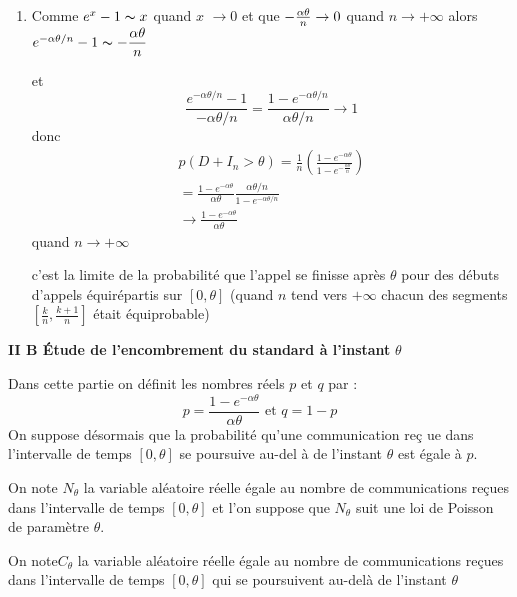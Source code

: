 \documentclass[a4paper, 11pt,reqno]{article}
\begin{document}
\begin{enumerate}
\item Comme $e^{x}-1\thicksim x$ quand $x$ $\rightarrow 0$ et que $-\frac{%
\alpha \theta }{n}\rightarrow 0$ quand $n\rightarrow +\infty $ alors $%
e^{-\alpha \theta /n}-1\thicksim -\displaystyle\frac{\alpha \theta }{n}$

et 
\begin{equation*}
\frac{e^{-\displaystyle \alpha \theta /n}-1}{-\alpha \theta /n}=\frac{1-e^{-%
\displaystyle \alpha \theta /n}}{\alpha \theta /n}\rightarrow 1
\end{equation*}
donc 
\begin{eqnarray*}
p\left( D+I_{n}>\theta \right) =\frac{1}{n}\left( \frac{\displaystyle %
1-e^{-\alpha \theta }}{\displaystyle 1-e^{-\frac{\alpha \theta }{n}}}\right)
\\
=\frac{1-e^{-\displaystyle \alpha \theta }}{\alpha \theta }\frac{\alpha
\theta /n}{1-e^{-\displaystyle \alpha \theta /n}} \\
\rightarrow \frac{1-e^{-\displaystyle \alpha \theta }}{\alpha \theta }
\end{eqnarray*}
quand $n\rightarrow +\infty $

c'est la limite de la probabilit\'{e} que l'appel se finisse apr\`{e}s $%
\theta $ pour des d\'{e}buts d'appels \'{e}quir\'{e}partis sur $\left[
0,\theta \right] $ (quand $n$ tend vers $+\infty $ chacun des segments $%
\left[ \frac{k}{n},\frac{k+1}{n}\right] $ \'{e}tait \'{e}quiprobable)
\end{enumerate}

\textbf{II B \'{E}tude de l'encombrement du standard \`{a} l'instant }$%
\theta $

Dans cette partie on d\'{e}finit les nombres r\'{e}els $p$ et $q$ par : 
\begin{equation*}
p=\frac{1-e^{-\alpha \theta }}{\alpha \theta }\text{ \ et \ \ }q=1-p
\end{equation*}
On suppose d\'{e}sormais que la probabilit\'{e} qu'une communication re\c{c}%
ue dans l'intervalle de temps $\left[ 0,\theta \right] $ se poursuive au-del%
\`{a} de l'instant $\theta $ est \'{e}gale \`{a} $p$.

On note $N_{\theta }$ la variable al\'{e}atoire r\'{e}elle \'{e}gale au
nombre de communications re\c{c}ues dans l'intervalle de temps $\left[
0,\theta \right] $ et l'on suppose que $N_{\theta }$ suit une loi de Poisson
de param\`{e}tre $\theta $.

On note$C_{\theta }$ la variable al\'{e}atoire r\'{e}elle \'{e}gale au
nombre de communications re\c{c}ues dans l'intervalle de temps $\left[
0,\theta \right] $ qui se poursuivent au-del\`{a} de l'instant $\theta $
\end{document}
